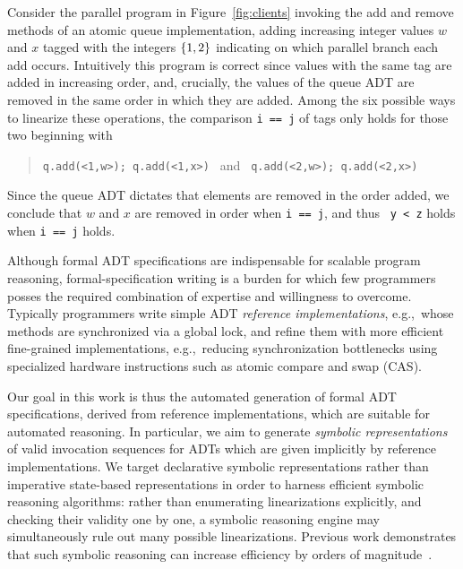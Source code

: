 \begin{example}

  Consider the parallel program in Figure~\ref{fig:clients} invoking the add and
  remove methods of an atomic queue implementation, adding increasing integer
  values $w$ and $x$ tagged with the integers ${\{{1,2}\}}$ indicating on which
  parallel branch each add occurs. Intuitively this program is correct since
  values with the same tag are added in increasing order, and, crucially, the
  values of the queue ADT are removed in the same order in which they are added.
  Among the six possible ways to linearize these operations, the comparison {\tt i ==
  j} of tags only holds for those two beginning with
  \begin{quote}
    \verb|q.add(<1,w>); q.add(<1,x>) | and \verb| q.add(<2,w>); q.add(<2,x>)|
  \end{quote}
  Since the queue ADT dictates that elements are removed in the order added, we
  conclude that $w$ and $x$ are removed in order when {\tt i == j}, and thus {\tt
  y < z} holds when {\tt i == j} holds.

\end{example}

Although formal ADT specifications are indispensable for scalable program
reasoning, formal-specification writing is a burden for which few programmers
posses the required combination of expertise and willingness to overcome.
Typically programmers write simple ADT \emph{reference implementations},
e.g.,~whose methods are synchronized via a global lock, and refine them with
more efficient fine-grained implementations, e.g.,~reducing synchronization
bottlenecks using specialized hardware instructions such as atomic compare and
swap (CAS).

Our goal in this work is thus the automated generation of formal ADT
specifications, derived from reference implementations, which are suitable for
automated reasoning. In particular, we aim to generate \emph{symbolic
representations} of valid invocation sequences for ADTs which are given
implicitly by reference implementations. We target declarative symbolic
representations rather than imperative state-based representations in order to
harness efficient symbolic reasoning algorithms: rather than enumerating
linearizations explicitly, and checking their validity one by one, a symbolic
reasoning engine may simultaneously rule out many possible linearizations.
Previous work demonstrates that such symbolic reasoning can increase
efficiency by orders of magnitude~\cite{conf/pldi/EmmiEH15}.

